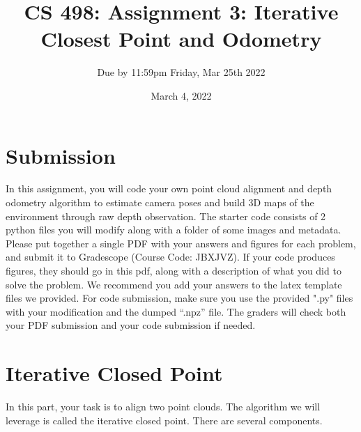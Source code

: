 \documentclass[11pt]{article}
\begin{document}




\author{Due by 11:59pm Friday, Mar 25th 2022}
\title{CS 498: Assignment 3: Iterative Closest Point and Odometry}
\date{March 4, 2022}
\maketitle

\medskip


\section*{Submission}
In this assignment, you will code your own point cloud alignment and depth odometry algorithm to estimate camera poses and build 3D maps of the environment through raw depth observation. The starter code consists of 2 python files you will modify along with a folder of some images and metadata. Please put together a single PDF with your answers and figures for each problem, and submit it to Gradescope (Course Code: JBXJVZ). If your code produces figures, they should go in this pdf, along with a description of what you did to solve the problem. We recommend you add your answers to the latex template files we provided. For code submission, make sure you use the provided ".py" files with your modification and the dumped ``.npz'' file. The graders will check both your PDF submission and your code submission if needed. 

\section*{Iterative Closed Point} 

In this part, your task is to align two point clouds. The algorithm we will leverage is called the iterative closed point. There are several components. 
\end{document}
